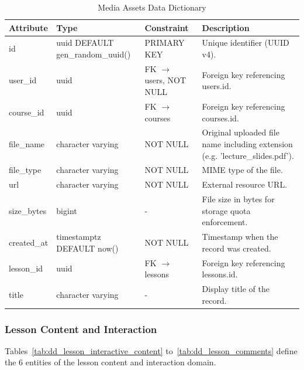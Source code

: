 \documentclass[12pt, oneside]{article} %
\newcommand{\tabbreak}{\hyphenpenalty=200\exhyphenpenalty=200\tolerance=4000\hbadness=10000\hspace{0pt}}
\begin{document}
\begin{table}[H]
\caption{Media Assets Data Dictionary}
\label{tab:dd_media_assets}
\vspace{-4mm}
\begin{center}
\renewcommand{\arraystretch}{1.15}
\scriptsize
\begin{tabular}{|>{\raggedright\arraybackslash\tabbreak}p{2.67cm}|>{\raggedright\arraybackslash\tabbreak}p{2.93cm}|>{\raggedright\arraybackslash\tabbreak}p{2.67cm}|>{\raggedright\arraybackslash\tabbreak}p{4.51cm}|}
\hline
\textbf{Attribute} & \textbf{Type} & \textbf{Constraint} & \textbf{Description} \\ \hline
id & uuid DEFAULT gen\_random\_uuid() & PRIMARY KEY & Unique identifier (UUID v4). \\ \hline
user\_id & uuid & FK $\rightarrow$ users, NOT NULL & Foreign key referencing users.id. \\ \hline
course\_id & uuid & FK $\rightarrow$ courses & Foreign key referencing courses.id. \\ \hline
file\_name & character varying & NOT NULL & Original uploaded file name including extension (e.g. 'lecture\_slides.pdf'). \\ \hline
file\_type & character varying & NOT NULL & MIME type of the file. \\ \hline
url & character varying & NOT NULL & External resource URL. \\ \hline
size\_bytes & bigint & - & File size in bytes for storage quota enforcement. \\ \hline
created\_at & timestamptz DEFAULT now() & NOT NULL & Timestamp when the record was created. \\ \hline
lesson\_id & uuid & FK $\rightarrow$ lessons & Foreign key referencing lessons.id. \\ \hline
title & character varying & - & Display title of the record. \\ \hline
\end{tabular}
\end{center}
\end{table}

\subsubsection{Lesson Content and Interaction}

Tables~\ref{tab:dd_lesson_interactive_content} to~\ref{tab:dd_lesson_comments} define the 6 entities of the lesson content and interaction domain.
\end{document}
